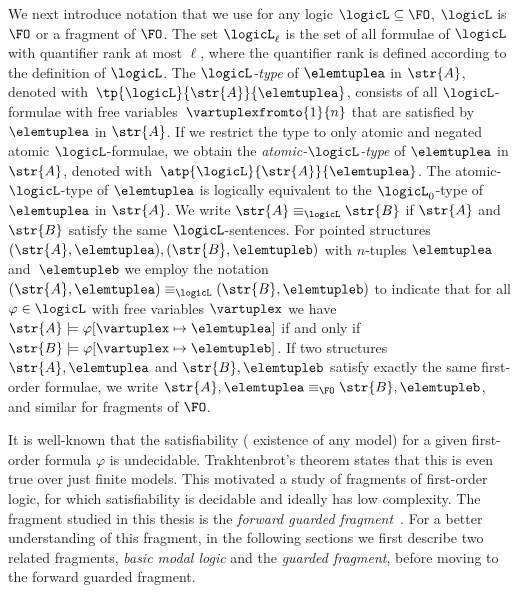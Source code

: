 We next introduce notation that we use for any logic $\logicL \subseteq \FO$, \ie{} $\logicL$ is $\FO$ or a fragment of $\FO$.
The set $\logicL_{\ell}$ is the set of all formulae of $\logicL$ with quantifier rank at most $\ell$, where the quantifier rank is defined according to the definition of $\logicL$.
The \emph{$\logicL$-type} of $\elemtuplea$ in $\str{A}$, denoted with~$\tp{\logicL}{\str{A}}{\elemtuplea}$, consists of all $\logicL$-formulae with free variables~$\vartuplexfromto{1}{n}$ that are satisfied by $\elemtuplea$ in $\str{A}$.
If we restrict the type to only atomic and negated atomic $\logicL$-formulae, we obtain the \emph{atomic-$\logicL$-type} of $\elemtuplea$ in $\str{A}$, denoted with~$\atp{\logicL}{\str{A}}{\elemtuplea}$.
The atomic-$\logicL$-type of $\elemtuplea$ is logically equivalent to the $\logicL_{0}$-type of $\elemtuplea$ in $\str{A}$.
We write $\str{A} \equiv_\logicL \str{B}$ if $\str{A}$ and~$\str{B}$ satisfy the same $\logicL$-sentences.
For pointed structures $(\str{A}, \elemtuplea), (\str{B}, \elemtupleb)$ with $n$-tuples $\elemtuplea$ and~$\elemtupleb$ we employ the notation $(\str{A}, \elemtuplea) \equiv_\logicL (\str{B}, \elemtupleb)$ to indicate that for all $\varphi \in \logicL$ with free variables $\vartuplex$ we have $\str{A} \models \varphi[\vartuplex \mapsto \elemtuplea]$ if and only if $\str{B} \models \varphi[\vartuplex \mapsto \elemtupleb]$.
If two structures $\str{A}, \elemtuplea$ and $\str{B}, \elemtupleb$ satisfy exactly the same first-order formulae, we write $\str{A}, \elemtuplea \equiv_{\FO} \str{B}, \elemtupleb$, and similar for fragments of $\FO$.

\begin{figure}
  \centering
  \label{fig:struct-1}
\end{figure}

It is well-known that the satisfiability (\ie{} existence of any model) for a given first-order formula $\varphi$ is undecidable\cite[Sec. 1.1]{borger1997}.
Trakhtenbrot's theorem states that this is even true over just finite models\cite{trakhtenbrot50}.
This motivated a study of fragments of first-order logic, for which satisfiability is decidable and ideally has low complexity.
The fragment studied in this thesis is the \emph{forward guarded fragment}~\cite[Sec. 3.1]{Bednarczyk21}.
For a better understanding of this fragment, in the following sections we first describe two related fragments, \emph{basic modal logic} and the \emph{guarded fragment}, before moving to the forward guarded fragment.

